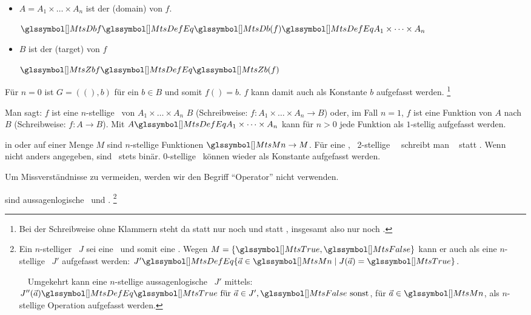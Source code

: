 \begin{description}
\begin{itemize}
		\item $A = A_1 \times \dots \times A_n$ ist der  (domain) von $f$.

		$\MtsDb f \MtsDefEq \MtsDb(f) \MtsDefEq A_1 \times \dots \times A_n$

		\item $B$ ist der  (target) von $f$

		$\MtsZb f \MtsDefEq \MtsZb(f)$
	\end{itemize}
	Für $n = 0$ ist $G = ((),b)$ für ein $b \in B$ und somit $f() = b$. $f$ kann damit auch als Konstante $b$ aufgefasst werden.%
	\footnote{%
		Bei der Schreibweise ohne Klammern steht da statt  nur noch  und statt , insgesamt also nur noch .
	}

	Man sagt: $f$ ist eine $n$-stellige \Funktion\ von $A_1 \times \dots \times A_n$  $B$ (Schreibweise: $f : A_1 \times \dots \times A_n \rightarrow B$) oder, im Fall $n=1$, $f$ ist eine Funktion von $A$ nach $B$ (Schreibweise: $f : A \rightarrow B$).
	Mit $A \MtsDefEq A_1 \times \dots \times A_n$ kann für $n > 0$ jede Funktion als $1$-stellig aufgefasst werden.

	\item [\Operationen] in oder auf einer Menge $M$ sind $n$-stellige Funktionen $\MtsMn \rightarrow M$.
	Für eine , \textdh\ 2-stellige \Operation\ \BspOpB\ schreibt man \textiAlg\  statt .
	Wenn nicht anders angegeben, sind \Operationen\ stets binär.
	0-stellige \Operationen\ können wieder als Konstante aufgefasst werden.

	Um Missverständnisse zu vermeiden, werden wir den Begriff "`Operator"' nicht verwenden.

	\item [\Junktoren] sind aussagenlogische \Relationen\ und \Operationen.%
	\footnote{\label{def-Junktor}%
		Ein $n$-stelliger \Junktor\ $J$ sei eine \Operation\ und somit eine \Funktion.
		Wegen $M = \{\MtsTrue,\MtsFalse\}$ kann er auch als eine $n$-stellige \Relation\ $J'$ aufgefasst werden:
		$J' \MtsDefEq \{\vec{a} \in \MtsMn \mid J(\vec{a}) = \MtsTrue\}$.

		~~Umgekehrt kann eine $n$-stellige aussagenlogische \Relation\ $J'$ mittels:
		$J''(\vec{a}) \MtsDefEq \MtsTrue \text{ für } \vec{a} \in J', \MtsFalse \text{ sonst}$, für $\vec{a} \in \MtsMn$, als $n$-stellige Operation aufgefasst werden.

}
\end{description}
